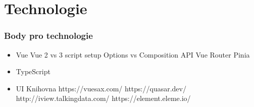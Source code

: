 
\chapter{Technologie}
\label{chap:technologie}

\subsection{Body pro technologie}
\begin{itemize}
    \item Vue
    \subitem Vue 2 vs 3
    \subitem script setup
    \subitem Options vs Composition API
    \subitem Vue Router
    \subitem Pinia
    \item TypeScript
    \item UI Knihovna
    \subitem https://vuesax.com/
    \subitem https://quasar.dev/
    \subitem http://iview.talkingdata.com/
    \subitem https://element.eleme.io/
\end{itemize}
